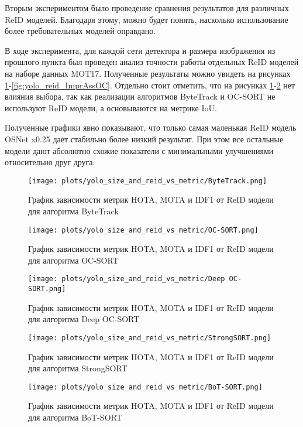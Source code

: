 Вторым экспериментом было проведение сравнения результатов для различных ReID моделей. Благодаря этому, можно будет понять, насколько использование более требовательных моделей оправдано. 

В ходе эксперимента, для каждой сети детектора и размера изображения из прошлого пункта был проведен анализ точности работы отдельных ReID моделей на наборе данных MOT17. Полученные результаты можно увидеть на рисунках \ref{fig:yolo_reid_ByteTrack}-\ref{fig:yolo_reid_ImprAssOC}. Отдельно стоит отметить, что на рисунках \ref{fig:yolo_reid_ByteTrack}-\ref{fig:yolo_reid_OC-SORT} нет влияния выбора, так как реализации алгоритмов ByteTrack и OC-SORT не используют ReID модели, а основываются на метрике IoU.

Полученные графики явно показывают, что только самая маленькая ReID модель OSNet x0.25 дает стабильно более низкий результат. При этом все остальные модели дают абсолютно схожие показатели с минимальными улучшениями относительно друг друга.
\begin{figure}[ht]
    \centering
    \texttt{[image: plots/yolo\_size\_and\_reid\_vs\_metric/ByteTrack.png]}
    \caption{График зависимости метрик HOTA, MOTA и IDF1 от ReID модели для алгоритма ByteTrack}
    \label{fig:yolo_reid_ByteTrack}
\end{figure}

\begin{figure}[ht]
    \centering
    \texttt{[image: plots/yolo\_size\_and\_reid\_vs\_metric/OC-SORT.png]}
    \caption{График зависимости метрик HOTA, MOTA и IDF1 от ReID модели для алгоритма OC-SORT}
    \label{fig:yolo_reid_OC-SORT}
\end{figure}

\begin{figure}[ht]
    \centering
    \texttt{[image: plots/yolo\_size\_and\_reid\_vs\_metric/Deep OC-SORT.png]}
    \caption{График зависимости метрик HOTA, MOTA и IDF1 от ReID модели для алгоритма Deep OC-SORT}
    \label{fig:yolo_reid_Deep OC-SORT}
\end{figure}

\begin{figure}[ht]
    \centering
    \texttt{[image: plots/yolo\_size\_and\_reid\_vs\_metric/StrongSORT.png]}
    \caption{График зависимости метрик HOTA, MOTA и IDF1 от ReID модели для алгоритма StrongSORT}
    \label{fig:yolo_reid_StrongSORT}
\end{figure}

\begin{figure}[ht]
    \centering
    \texttt{[image: plots/yolo\_size\_and\_reid\_vs\_metric/BoT-SORT.png]}
    \caption{График зависимости метрик HOTA, MOTA и IDF1 от ReID модели для алгоритма BoT-SORT}
    \label{fig:yolo_reid_BoT-SORT}
\end{figure}

